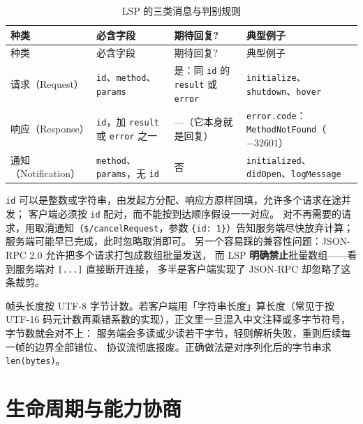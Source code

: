\documentclass[12pt,a4paper,fontset=fandol]{ctexbook}
\newcommand{\Bk}{\discretionary{}{}{}}
\begin{document}
\begin{longtable}{>{\raggedright\arraybackslash}p{}
                  >{\raggedright\arraybackslash}p{}
                  >{\raggedright\arraybackslash}p{}
                  >{\raggedright\arraybackslash}p{}}
\caption{LSP 的三类消息与判别规则}\label{tab:ch04-msg}\\
\toprule
种类 & 必含字段 & 期待回复? & 典型例子 \\
\midrule
\endfirsthead
\toprule
种类 & 必含字段 & 期待回复? & 典型例子 \\
\midrule
\endhead
请求（Request） & \texttt{id}、\texttt{method}、\texttt{params} & 是：同 \texttt{id} 的 \texttt{result} 或 \texttt{error} & \texttt{initialize}、\texttt{shutdown}、\texttt{hover} \\
\midrule
响应（Response） & \texttt{id}，加 \texttt{result} 或 \texttt{error} 之一 & ---（它本身就是回复） & \texttt{error.code}：\texttt{MethodNotFound}（$-32601$） \\
\midrule
通知（Notification） & \texttt{method}、\texttt{params}，无 \texttt{id} & 否 & \texttt{initialized}、\texttt{didOpen}、\texttt{logMessage} \\
\bottomrule
\end{longtable}

\texttt{id} 可以是整数或字符串，由发起方分配、响应方原样回填，允许多个请求在途并发；
客户端必须按 \texttt{id} 配对，而不能按到达顺序假设一一对应。
对不再需要的请求，用取消通知（\texttt{\$/cancelRequest}\Bk{}，参数
\texttt{\{id: 1\}}）告知服务端尽快放弃计算；服务端可能早已完成，此时忽略取消即可。
另一个容易踩的兼容性问题：JSON-RPC 2.0 允许把多个请求打包成数组批量发送，
而 LSP \textbf{明确禁止}批量数组——看到服务端对 \texttt{[{...}]} 直接断开连接，
多半是客户端实现了 JSON-RPC 却忽略了这条裁剪。

\begin{note}[title={Content-Length 数的是 UTF-8 字节，不是字符}]
帧头长度按 UTF-8 字节计数。若客户端用「字符串长度」算长度（常见于按 UTF-16
码元计数再乘错系数的实现），正文里一旦混入中文注释或多字节符号，字节数就会对不上：
服务端会多读或少读若干字节，轻则解析失败，重则后续每一帧的边界全部错位、
协议流彻底报废。正确做法是对序列化后的字节串求 \texttt{len(bytes)}。
\end{note}

\section{生命周期与能力协商}\label{sec:ch04-s2}
\end{document}
